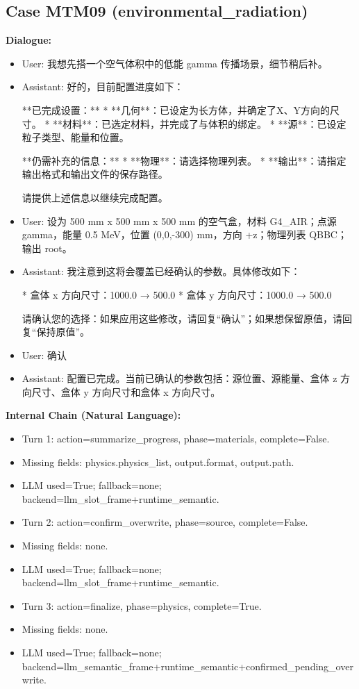 \documentclass[11pt]{ctexart}
\begin{document}
\subsection{Case MTM09 (environmental\_radiation)}
\textbf{Dialogue:}
\begin{itemize}
\item User: 我想先搭一个空气体积中的低能 gamma 传播场景，细节稍后补。
\item Assistant: 好的，目前配置进度如下：

**已完成设置：**
*   **几何**：已设定为长方体，并确定了X、Y方向的尺寸。
*   **材料**：已选定材料，并完成了与体积的绑定。
*   **源**：已设定粒子类型、能量和位置。

**仍需补充的信息：**
*   **物理**：请选择物理列表。
*   **输出**：请指定输出格式和输出文件的保存路径。

请提供上述信息以继续完成配置。
\item User: 设为 500 mm x 500 mm x 500 mm 的空气盒，材料 G4\_AIR；点源 gamma，能量 0.5 MeV，位置 (0,0,-300) mm，方向 +z；物理列表 QBBC；输出 root。
\item Assistant: 我注意到这将会覆盖已经确认的参数。具体修改如下：

*   盒体 x 方向尺寸：1000.0 → 500.0
*   盒体 y 方向尺寸：1000.0 → 500.0

请确认您的选择：如果应用这些修改，请回复“确认”；如果想保留原值，请回复“保持原值”。
\item User: 确认
\item Assistant: 配置已完成。当前已确认的参数包括：源位置、源能量、盒体 z 方向尺寸、盒体 y 方向尺寸和盒体 x 方向尺寸。
\end{itemize}
\textbf{Internal Chain (Natural Language):}
\begin{itemize}
\item Turn 1: action=summarize\_progress, phase=materials, complete=False.
\item Missing fields: physics.physics\_list, output.format, output.path.
\item LLM used=True; fallback=none; backend=llm\_slot\_frame+runtime\_semantic.
\item Turn 2: action=confirm\_overwrite, phase=source, complete=False.
\item Missing fields: none.
\item LLM used=True; fallback=none; backend=llm\_slot\_frame+runtime\_semantic.
\item Turn 3: action=finalize, phase=physics, complete=True.
\item Missing fields: none.
\item LLM used=True; fallback=none; backend=llm\_semantic\_frame+runtime\_semantic+confirmed\_pending\_overwrite.
\end{itemize}
\end{document}
